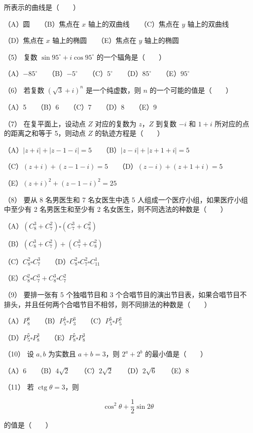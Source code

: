 \begin{answer}
所表示的曲线是\mbox{（　　）}

（A）圆　　（B）焦点在 $x$ 轴上的双曲线　　（C）焦点在 $y$ 轴上的双曲线

（D）焦点在 $x$ 轴上的椭圆　　（E）焦点在 $y$ 轴上的椭圆

（5） 复数 $\sin95^\circ+i\cos95^\circ$ 的一个辐角是\mbox{（　　）}

（A）$-85^\circ$　　（B）$-5^\circ$　　（C）$5^\circ$　　（D）$85^\circ$　　（E）$95^\circ$

（6） 若复数 $(\sqrt3+i)^n$ 是一个纯虚数，则 $n$ 的一个可能的值是\mbox{（　　）}

（A）5　　（B）6　　（C）7　　（D）8　　（E）9

（7） 在复平面上，设动点 $Z$ 对应的复数为 $z$，$Z$ 到复数 $-i$ 和 $1+i$ 所对应的点的距离之和等于 5，则动点 $Z$ 的轨迹方程是\mbox{（　　）}

（A）$|z+i|+|z-1-i|=5$　　（B）$|z-i|+|z+1+i|=5$

（C）$(z+i)+(z-1-i)=5$　　（D）$(z-i)+(z+1+i)=5$

（E）$(z+i)^2+(z-1-i)^2=25$

（8） 要从 8 名男医生和 7 名女医生中选 5 人组成一个医疗小组，如果医疗小组中至少有 2 名男医生和至少有 2 名女医生，则不同选法的种数是\mbox{（　　）}

（A）$(C_8^3+C_7^2)\square(C_7^3+C_8^2)$

（B）$(C_8^3+C_7^2)+(C_7^3+C_8^2)$

（C）$C_8^2\square C_7^3$　　（D）$C_8^2\square C_7^2\square C_{11}^1$

（E）$C_8^2\square C_7^3+C_8^3\square C_7^2$


（9） 要排一张有 5 个独唱节目和 3 个合唱节目的演出节目表，如果合唱节目不排头，并且任何两个合唱节目不相邻，则不同排法的种数是\mbox{（　　）}

（A）$P_8^8$　　（B）$P_5^5\square P_3^3$　　（C）$P_5^5\square P_5^3$

（D）$P_5^5\square P_8^3$　　（E）$P_8^5\square P_8^3$

（10） 设 $a,b$ 为实数且 $a+b=3$，则 $2^a+2^b$ 的最小值是\mbox{（　　）}

（A）6　　（B）$4\sqrt2$　　（C）$2\sqrt2$　　（D）$2\sqrt6$　　（E）8

（11） 若 $\operatorname{ctg}\theta=3$，则

\nopagebreak[4]
\[
\cos^2\theta+\frac12\sin2\theta
\]

的值是\mbox{（　　）}


\end{answer}

